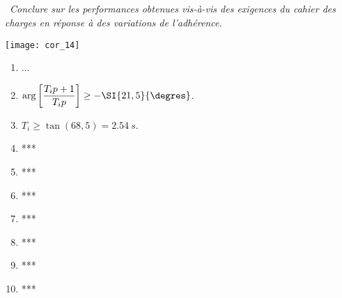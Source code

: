 \begin{multicols}{2}
\subparagraph{}\textbf{ \, }\textit{Conclure sur les performances obtenues vis-à-vis des exigences du cahier des charges en réponse à des variations de l’adhérence.}
\ifprof
\begin{corrige}
\begin{center}
\texttt{[image: cor\_14]}
\end{center}
\end{corrige}
\else
\fi

\footnotesize
\begin{enumerate}
\item ...
\item $\arg \left[  \dfrac{T_i p+1}{T_i p}  \right] \geq - \SI{21,5}{\degres}$.
\item $T_i \geq \tan(68,5)=\SI{2,54}{s}$.
\item ***
\item ***
\item ***
\item ***
\item ***
\item ***
\item ***
\end{enumerate}
\normalsize


\ifprof
\else
\end{multicols}
\fi

